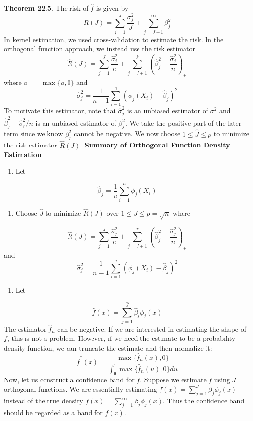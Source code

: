 \textbf{Theorem 22.5}. The risk of \(\hat{f}\) is given by
\[
R(J) = \sum_{j=1}^J \frac{\sigma_{j}^{2}}{J} + \sum_{j=J+1}^{\infty} \beta_{j}^{2}
\]
In kernel estimation, we used cross-validation to estimate the risk. In
the orthogonal function approach, we instead use the risk estimator
\[
\hat{R}(J) = \sum_{j=1}^J \frac{\hat{\sigma}_{j}^{2}}{n} + \sum_{j=J+1}^p \left( \hat{\beta}_{j}^{2} - \frac{\hat{\sigma}_{j}^{2}}{n} \right)_{+}
\]
where \(a_{+} = \max \{ a, 0 \}\) and
\[
\hat{\sigma}_{j}^{2} = \frac{1}{n - 1} \sum_{i=1}^{n} \left( \phi_{j}(X_{i}) - \hat{\beta}_{j}\right)^{2}
\]
To motivate this estimator, note that \(\hat{\sigma}_{j}^{2}\) is an
unbiased estimator of \(\sigma^{2}\) and
\(\hat{\beta}_{j}^{2} - \hat{\sigma}_{j}^{2} / n\) is an unbiased estimator of
\(\beta_{j}^{2}\). We take the positive part of the later term since we know
\(\beta_{j}^{2}\) cannot be negative. We now choose
\(1 \leq \hat{J} \leq p\) to minimize the risk estimator \(\hat{R}(J)\).
\textbf{Summary of Orthogonal Function Density Estimation}
\begin{enumerate}[tightlist,label={\arabic*.}]
\item
  Let
\end{enumerate}
\[
\hat{\beta}_{j} = \frac{1}{n} \sum_{i=1}^{n} \phi_{j}(X_{i})
\]
\begin{enumerate}[tightlist,label={\arabic*.}]
\item
  Choose \(\hat{J}\) to minimize \(\hat{R}(J)\) over
  \(1 \leq J \leq p = \sqrt{n}\) where
\end{enumerate}
\[
\hat{R}(J) = \sum_{j=1}^J \frac{\hat{\sigma}_{j}^{2}}{n} + \sum_{j=J+1}^p \left( \hat{\beta}_{j}^{2} - \frac{\hat{\sigma}_{j}^{2}}{n} \right)_{+}
\]
and
\[
\hat{\sigma}_{j}^{2} = \frac{1}{n - 1} \sum_{i=1}^{n} \left( \phi_{j}(X_{i}) - \hat{\beta}_{j}\right)^{2}
\]
\begin{enumerate}[tightlist,label={\arabic*.},resume]
\item
  Let
\end{enumerate}
\[
\hat{f}(x) = \sum_{j=1}^{\hat{J}} \hat{\beta}_{j} \phi_{j}(x)
\]
The estimator \(\hat{f}_{n}\) can be negative. If we are interested in
estimating the shape of \(f\), this is not a problem. However, if we
need the estimate to be a probability density function, we can truncate
the estimate and then normalize it:\\
\[
\hat{f}^{*}(x) = \frac{\max \{ \hat{f}_{n}(x), 0 \}}{\int_{0}^{1} \max \{ \hat{f}_{n}(u), 0 \} du}
\]
Now, let us construct a confidence band for \(f\). Suppose we estimate
\(f\) using \(J\) orthogonal functions. We are essentially estimating
\(\bar{f}(x) = \sum_{j=1}^J \beta_{j} \phi_{j}(x)\) instead of the true
density \(f(x) = \sum_{j=1}^{\infty} \beta_{j} \phi_{j}(x)\). Thus the
confidence band should be regarded as a band for \(\bar{f}(x)\).

